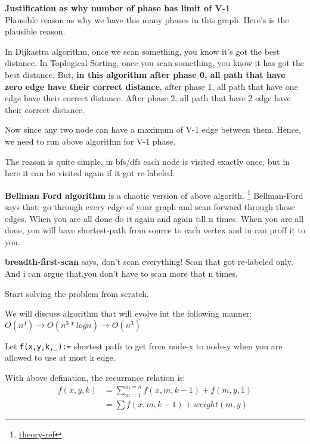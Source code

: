 \textbf{Justification as why number of phase has limit of V-1}\\
Plausible reason as why we have this many phases in this graph. Here's is the plausible reason.

In Dijkastra algorithm, once we scan something, you know it's got the best distance. In Toplogical Sorting, once you scan something, you know it has got the best distance. But, \textbf{in this algorithm after phase 0, all path that have zero edge have their correct distance}, after phase 1, all path that have one edge have their correct distance. After phase 2, all path that have 2 edge have their correct distance.

Now since any two node can have a maximum of V-1 edge between them. Hence, we need to run above algorithm for V-1 phase.

 The reason is quite simple, in bfs/dfs each node is visited exactly once, but in here it can be visited again if it got re-labeled.

\textbf{Bellman Ford algorithm} is a chaotic version of above algorith. \footnote{\href{https://youtu.be/XIAQRlNkJAw?t=2335}{theory-ref}} 
Bellman-Ford says that: go through every edge of your graph and scan forward through those edges. When you are all done do it again and again till n times. When you are all done, you will have shortest-path from source to each vertex and in can proff it to you.

\textbf{breadth-first-scan} says, don't scan everything! Scan that got re-labeled only. And i can argue that,you don't have to scan more that n times.




Start solving the problem from scratch.

We will discuss algorithm that will evolve int the following manner:
$O(n^4) \rightarrow O(n^3*log n) \rightarrow O(n^3) $

Let \verb|f(x,y,k,_):=| shortest path to get from node-x to node-y when you are allowed to use at most k edge.

With above defination, the recurrance relation is: \begin{align}
    f(x,y,k) &= \sum_{m=1}^{m=n} f(x,m,k-1) + f(m,y,1)\\
    &=\sum f(x,m,k-1) + weight(m,y)
\end{align}

